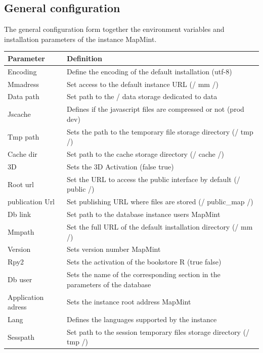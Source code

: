 \documentclass[letterpaper,10pt,english]{sphinxmanual}
\begin{document}
\subsection{General configuration}
\label{dashboard/configuration:configuration-generale}
The general configuration form together the environment variables and installation parameters of the instance MapMint.

\begin{tabulary}{\linewidth}{|L|L|}
\hline

\textbf{Parameter}
 & 
\textbf{Definition}
\\
\hline
Encoding
 & 
Define the encoding of the default installation (utf-8)
\\
\hline
Mmadress
 & 
Set access to the default instance URL (/ mm /)
\\
\hline
Data path
 & 
Set path to the / data storage dedicated to data
\\
\hline
Jscache
 & 
Defines if the javascript files are compressed or not (prod \textbar{} dev)
\\
\hline
Tmp path
 & 
Sets the path to the temporary file storage directory (/ tmp /)
\\
\hline
Cache dir
 & 
Set path to the cache storage directory (/ cache /)
\\
\hline
3D
 & 
Sets the 3D Activation (false \textbar{} true)
\\
\hline
Root url
 & 
Set the URL to access the public interface by default (/ public /)
\\
\hline
publication Url
 & 
Set publishing URL where files are stored (/ public\_map /)
\\
\hline
Db link
 & 
Set path to the database instance users MapMint
\\
\hline
Mmpath
 & 
Set the full URL of the default installation directory (/ mm /)
\\
\hline
Version
 & 
Sets version number MapMint
\\
\hline
Rpy2
 & 
Sets the activation of the bookstore R (true \textbar{} false)
\\
\hline
Db user
 & 
Sets the name of the corresponding section in the parameters of the database
\\
\hline
Application adress
 & 
Sets the instance root address MapMint
\\
\hline
Lang
 & 
Defines the languages supported by the instance
\\
\hline
Sesspath
 & 
Set path to the session temporary files storage directory (/ tmp /)

\end{tabulary}
\end{document}
